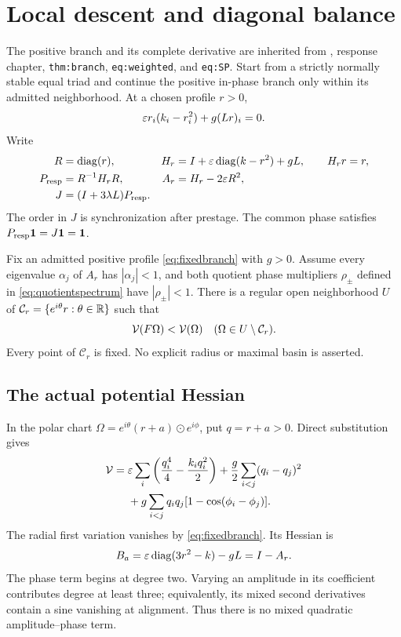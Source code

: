 \section{Local descent and diagonal balance}\label{sec:local}

The positive branch and its complete derivative are inherited from \cite{nrg}, response chapter, \texttt{thm:branch}, \texttt{eq:weighted}, and \texttt{eq:SP}. Start from a strictly normally stable equal triad and continue the positive in-phase branch only within its admitted neighborhood. At a chosen profile \(r>0\),
\begin{equation}
\varepsilon r_i(k_i-r_i^2)+g(Lr)_i=0.
\label{eq:fixedbranch}
\end{equation}
Write
\begin{align}
R&=\operatorname{diag}(r),&
H_r&=I+\varepsilon\operatorname{diag}(k-r^2)+gL,\qquad H_rr=r,\notag\\
P_{\rm resp}&=R^{-1}H_rR,&
A_r&=H_r-2\varepsilon R^2,\notag\\
J&=(I+3\lambda L)P_{\rm resp}.&&
\label{eq:response}
\end{align}
The order in \(J\) is synchronization after prestage. The common phase satisfies \(P_{\rm resp}\mathbf1=J\mathbf1=\mathbf1\).

\begin{theorem}\label{thm:local}
Fix an admitted positive profile \eqref{eq:fixedbranch} with \(g>0\). Assume every eigenvalue \(\alpha_j\) of \(A_r\) has \(|\alpha_j|<1\), and both quotient phase multipliers \(\rho_\pm\) defined in \eqref{eq:quotientspectrum} have \(|\rho_\pm|<1\). There is a regular open neighborhood \(U\) of
\(\mathcal C_r=\{e^{i\theta}r:\theta\in\mathbb R\}\) such that
\[
\mathcal V(F\Omega)<\mathcal V(\Omega)\quad(\Omega\in U\setminus\mathcal C_r).
\]
Every point of \(\mathcal C_r\) is fixed. No explicit radius or maximal basin is asserted.
\end{theorem}

\subsection{The actual potential Hessian}
In the polar chart
\(\Omega=e^{i\theta}(r+a)\odot e^{i\phi}\), put \(q=r+a>0\). Direct substitution gives
\begin{align}
\mathcal V={}&\varepsilon\sum_i\left(\frac{q_i^4}{4}-\frac{k_iq_i^2}{2}\right)
+\frac g2\sum_{i<j}(q_i-q_j)^2\notag\\
&+g\sum_{i<j}q_iq_j[1-\cos(\phi_i-\phi_j)].
\label{eq:polar}
\end{align}
The radial first variation vanishes by \eqref{eq:fixedbranch}. Its Hessian is
\begin{equation}
B_a=\varepsilon\operatorname{diag}(3r^2-k)-gL=I-A_r.
\label{eq:Ba}
\end{equation}
The phase term begins at degree two. Varying an amplitude in its coefficient contributes degree at least three; equivalently, its mixed second derivatives contain a sine vanishing at alignment. Thus there is no mixed quadratic amplitude--phase term.

